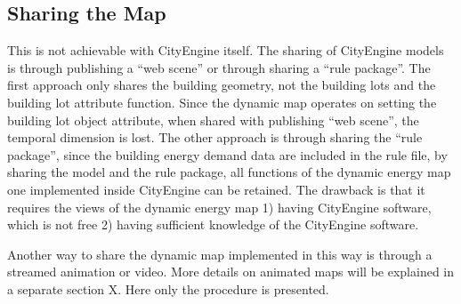 \subsection{Sharing the Map}
This is not achievable with CityEngine itself. The sharing of
CityEngine models is through publishing a ``web scene'' or through
sharing a ``rule package''. The first approach only shares the
building geometry, not the building lots and the building lot
attribute function. Since the dynamic map operates on setting the
building lot object attribute, when shared with publishing ``web
scene'', the temporal dimension is lost. The other approach is through
sharing the ``rule package'', since the building energy demand data
are included in the rule file, by sharing the model and the rule
package, all functions of the dynamic energy map one implemented
inside CityEngine can be retained. The drawback is that it requires
the views of the dynamic energy map 1) having CityEngine software,
which is not free 2) having sufficient knowledge of the CityEngine
software.

Another way to share the dynamic map implemented in this way is
through a streamed animation or video. More details on animated maps
will be explained in a separate section X. Here only the procedure is
presented.